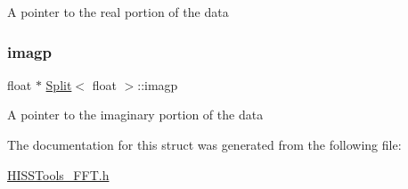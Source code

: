 A pointer to the real portion of the data \mbox{\label{struct_split_a21ff23a96abee0c0ed6a2433798c4eac}} 
\subsubsection{\texorpdfstring{imagp}{imagp}}
{\footnotesize\ttfamily float $\ast$ \hyperlink{struct_split}{Split}$<$ float  $>$\+::imagp\hspace{0.3cm}{\ttfamily [inherited]}}

A pointer to the imaginary portion of the data 

The documentation for this struct was generated from the following file\+:\begin{DoxyCompactItemize}
\item 
\hyperlink{_h_i_s_s_tools___f_f_t_8h}{H\+I\+S\+S\+Tools\+\_\+\+F\+F\+T.\+h}\end{DoxyCompactItemize}
